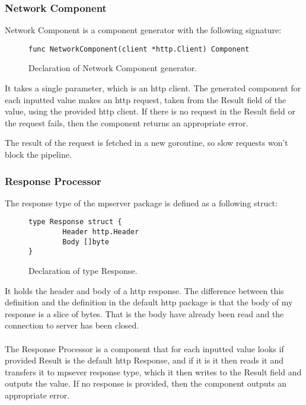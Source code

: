 \documentclass[12pt,a4paper]{article}
\begin{document}
\subsubsection{Network Component}
Network Component is a component generator with the following signature:

\begin{figure}[h]
\centering
\begin{lstlisting}
func NetworkComponent(client *http.Client) Component
\end{lstlisting}
\caption[scale=1.0]{Declaration of Network Component generator.}
\label{fig:NetworkComponent}
\end{figure}

It takes a single parameter, which is an http client.
The generated component for each inputted value makes an http request,
taken from the Result field of the value, using the provided http client.
If there is no request in the Result field or the request fails, then
the component returns an appropriate error. 

The result of the request is fetched in a new goroutine, so slow requests
won't block the pipeline.

\subsubsection{Response Processor}
The response type of the mpserver package is defined as a following struct:

\begin{figure}[h]
\centering
\begin{lstlisting}
type Response struct {
		Header http.Header
		Body []byte
}
\end{lstlisting}
\caption[scale=1.0]{Declaration of type Response.}
\label{fig:Response}
\end{figure}

It holds the header and body of a http response. The difference between
this definition and the definition in the default http package is that
the body of my response is a slice of bytes. That is the body have already been
read and the connection to server has been closed.
\\
\\
The Response Processor is a component that for each inputted value
looks if provided Result is the default http Response, and if it is
it then reads it and transfers it to mpsever response type, which it
then writes to the Result field and outputs the value. If no response
is provided, then the component outputs an appropriate error.
\end{document}
